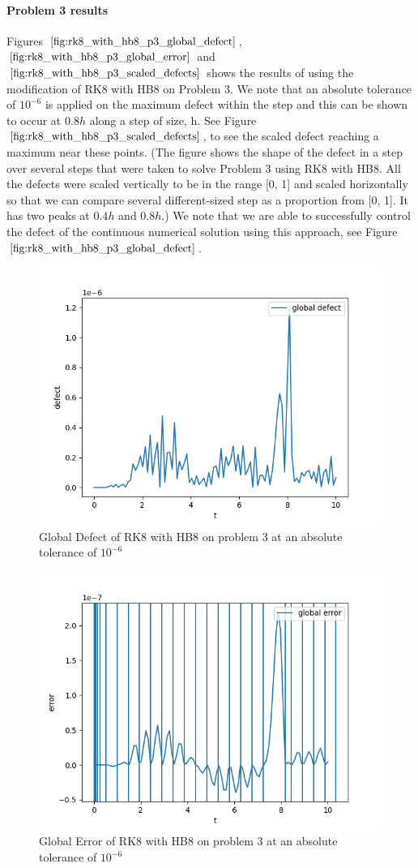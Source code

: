 \documentclass{article}
\begin{document}
\paragraph{Problem 3 results}
Figures $\ref{fig:rk8_with_hb8_p3_global_defect}$, $\ref{fig:rk8_with_hb8_p3_global_error}$ and $\ref{fig:rk8_with_hb8_p3_scaled_defects}$ shows the results of using the modification of RK8 with HB8 on Problem 3. 
We note that an absolute tolerance of $10^{-6}$ is applied on the maximum defect within the step and this can be shown to occur at $0.8h$ along a step of size, h. See Figure $\ref{fig:rk8_with_hb8_p3_scaled_defects}$, to see the scaled defect reaching a maximum near these points. (The figure shows the shape of the defect in a step over several steps that were taken to solve Problem 3 using RK8 with HB8. All the defects were scaled vertically to be in the range [0, 1] and scaled horizontally so that we can compare several different-sized step as a proportion from [0, 1]. It has two peaks at $0.4h$ and $0.8h$.) We note that we are able to successfully control the defect of the continuous numerical solution using this approach, see Figure $\ref{fig:rk8_with_hb8_p3_global_defect}$. 


\begin{figure}[H]
\centering
\includegraphics[width=0.7\linewidth]{./figures/rk8_with_hb8_p3_global_defect}
\caption{Global Defect of RK8 with HB8 on problem 3 at an absolute tolerance of $10^{-6}$}
\label{fig:rk8_with_hb8_p3_global_defect}
\end{figure}

\begin{figure}[H]
\centering
\includegraphics[width=0.7\linewidth]{./figures/rk8_with_hb8_p3_global_error}
\caption{Global Error of RK8 with HB8 on problem 3 at an absolute tolerance of $10^{-6}$}
\label{fig:rk8_with_hb8_p3_global_error}
\end{figure}
\end{document}
